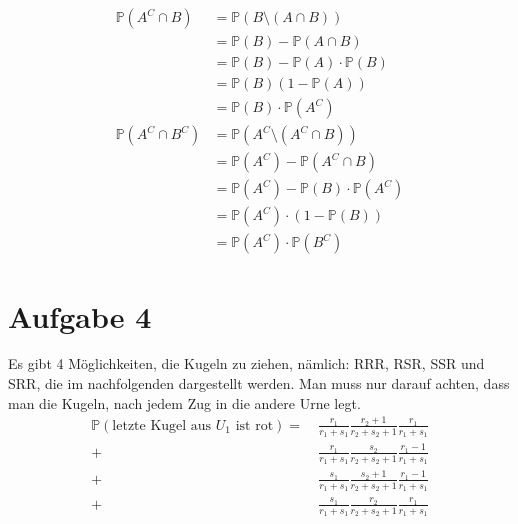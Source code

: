 \documentclass[10pt,a4paper,parskip=half]{scrartcl}
\newcommand{\PP}{\mathbb{P}}
\begin{document}
\begin{enumerate}
		\begin{align*}
			\PP(A^C \cap B) &= \PP(B \setminus (A \cap B)) \\
			&= \PP(B) - \PP(A \cap B) \\
			&= \PP(B) - \PP(A) \cdot \PP(B) \\
			&= \PP(B)(1 - \PP(A)) \\
			&= \PP(B)\cdot\PP(A^C) \\
			\PP(A^C \cap B^C) &= \PP(A^C \setminus (A^C \cap B)) \\
			&= \PP(A^C) - \PP(A^C \cap B) \\
			&= \PP(A^C) - \PP(B)\cdot\PP(A^C)  \\
			&= \PP(A^C)\cdot(1 - \PP(B)) \\
			&= \PP(A^C)\cdot\PP(B^C)
		\end{align*}
\end{enumerate}

\section*{Aufgabe 4}
Es gibt 4 Möglichkeiten, die Kugeln zu ziehen, nämlich: RRR, RSR, SSR und SRR, die im nachfolgenden dargestellt werden. Man muss nur darauf achten, dass man die Kugeln, nach jedem Zug in die andere Urne legt.
\begin{align*} 
\mathbb P(\text{letzte Kugel aus $U_1$ ist rot}) =&~ \frac{r_1}{r_1+s_1}\frac{r_2 + 1}{r_2+s_2 + 1}\frac{r_1}{r_1+s_1}\\
+&~ \frac{r_1}{r_1+s_1}\frac{s_2}{r_2+s_2 + 1}\frac{r_1-1}{r_1+s_1}\\
+&~ \frac{s_1}{r_1+s_1}\frac{s_2+1}{r_2+s_2 + 1}\frac{r_1-1}{r_1+s_1}\\
+&~ \frac{s_1}{r_1+s_1}\frac{r_2}{r_2+s_2 + 1}\frac{r_1}{r_1+s_1}
\end{align*}
\end{document}
